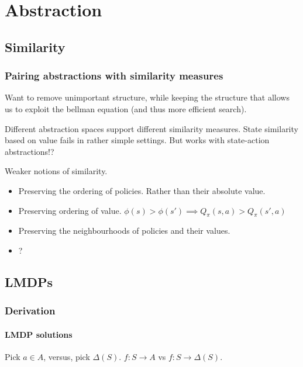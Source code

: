 \chapter{Abstraction}

\section{Similarity}

\subsection{Pairing abstractions with similarity measures}


Want to remove unimportant structure, while keeping the structure that allows us
to exploit the bellman equation (and thus more efficient search).

Different abstraction spaces support different similarity measures.
State similarity based on value fails in rather simple settings.
But works with state-action abstractions!?

Weaker notions of similarity.
\begin{itemize}
\tightlist
  \item Preserving the ordering of policies. Rather than their absolute value.
  \item Preserving ordering of value. $\phi(s) > \phi(s') \implies Q_{\pi}(s, a) > Q_{\pi}(s', a)$
  \item Preserving the neighbourhoods of policies and their values.
  \item ?
\end{itemize}


\section{LMDPs}

\subsection{Derivation}

\subsubsection{LMDP solutions}

Pick $a \in A$, versus, pick $\Delta(S)$. $f: S\to A$ vs $f:S \to \Delta(S)$.

